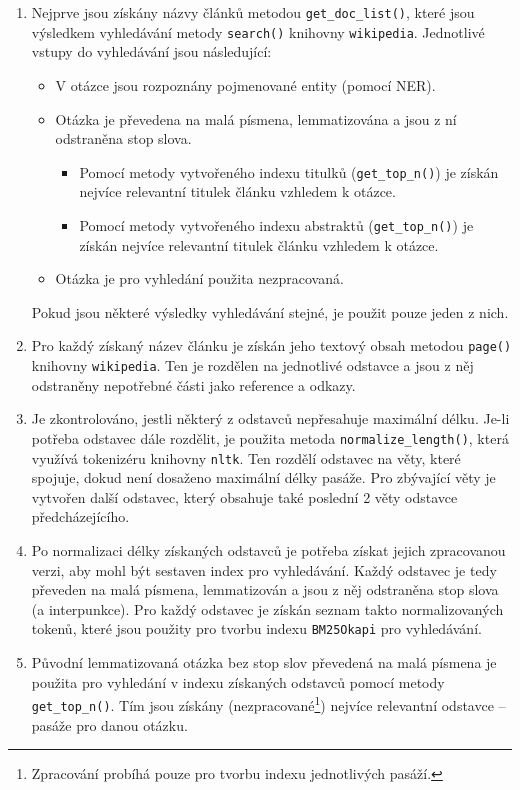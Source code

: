 \begin{enumerate}
    \item Nejprve jsou získány názvy článků metodou \texttt{get\_doc\_list()}, které jsou výsledkem vyhledávání metody \texttt{search()} knihovny \texttt{wikipedia}. Jednotlivé vstupy do vyhledávání jsou následující:
    \begin{itemize}
        \item V otázce jsou rozpoznány pojmenované entity (pomocí NER).
        \item Otázka je převedena na malá písmena, lemmatizována a jsou z ní odstraněna stop slova.
        \begin{itemize}
            \item Pomocí metody vytvořeného indexu titulků (\texttt{get\_top\_n()}) je získán nejvíce relevantní titulek článku vzhledem k otázce.
            \item Pomocí metody vytvořeného indexu abstraktů (\texttt{get\_top\_n()}) je získán nejvíce relevantní titulek článku vzhledem k otázce.
        \end{itemize}
        \item Otázka je pro vyhledání použita nezpracovaná.
    \end{itemize}
    Pokud jsou některé výsledky vyhledávání stejné, je použit pouze jeden z nich.
    
    \item Pro každý získaný název článku je získán jeho textový obsah metodou \texttt{page()} kni\-hovny \texttt{wikipedia}. Ten je rozdělen na jednotlivé odstavce a jsou z něj odstraněny nepotřebné části jako reference a odkazy.
    
    \item Je zkontrolováno, jestli některý z odstavců nepřesahuje maximální délku. Je-li potřeba odstavec dále rozdělit, je použita metoda \texttt{normalize\_length()}, která využívá tokenizéru knihovny \texttt{nltk}. Ten rozdělí odstavec na věty, které spojuje, dokud není dosaženo maximální délky pasáže. Pro zbývající věty je vytvořen další odstavec, který obsahuje také poslední 2 věty odstavce předcházejícího.
    
    \item Po normalizaci délky získaných odstavců je potřeba získat jejich zpracovanou verzi, aby mohl být sestaven index pro vyhledávání. Každý odstavec je tedy převeden na malá písmena, lemmatizován a jsou z něj odstraněna stop slova (a interpunkce). Pro každý odstavec je získán seznam takto normalizovaných tokenů, které jsou použity pro tvorbu indexu \texttt{BM25Okapi} pro vyhledávání.
    
    \item Původní lemmatizovaná otázka bez stop slov převedená na malá písmena je použita pro vyhledání v indexu získaných odstavců pomocí metody \texttt{get\_top\_n()}. Tím jsou získány (nezpracované\footnote{Zpracování probíhá pouze pro tvorbu indexu jednotlivých pasáží.}) nejvíce relevantní odstavce -- pasáže pro danou otázku.
\end{enumerate}
\pagebreak
